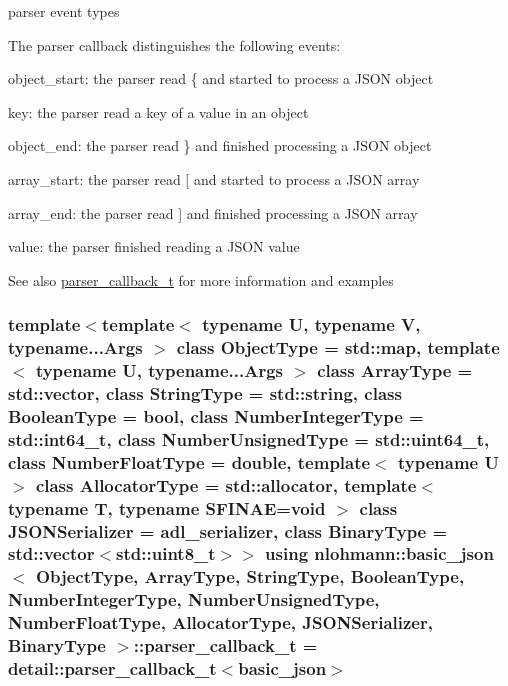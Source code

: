 parser event types 

The parser callback distinguishes the following events\+:
\begin{DoxyItemize}
\item {\ttfamily object\+\_\+start}\+: the parser read {\ttfamily \{} and started to process a J\+S\+ON object
\item {\ttfamily key}\+: the parser read a key of a value in an object
\item {\ttfamily object\+\_\+end}\+: the parser read {\ttfamily \}} and finished processing a J\+S\+ON object
\item {\ttfamily array\+\_\+start}\+: the parser read {\ttfamily \mbox{[}} and started to process a J\+S\+ON array
\item {\ttfamily array\+\_\+end}\+: the parser read {\ttfamily \mbox{]}} and finished processing a J\+S\+ON array
\item {\ttfamily value}\+: the parser finished reading a J\+S\+ON value
\end{DoxyItemize}

 \begin{DoxySeeAlso}{See also}
\hyperlink{classnlohmann_1_1basic__json_a0273d074462644e5d5a7ff313ad0d742}{parser\+\_\+callback\+\_\+t} for more information and examples 
\end{DoxySeeAlso}
\subsubsection[{\texorpdfstring{parser\+\_\+callback\+\_\+t}{parser_callback_t}}]{\setlength{\rightskip}{0pt plus 5cm}template$<$template$<$ typename U, typename V, typename...\+Args $>$ class Object\+Type = std\+::map, template$<$ typename U, typename...\+Args $>$ class Array\+Type = std\+::vector, class String\+Type  = std\+::string, class Boolean\+Type  = bool, class Number\+Integer\+Type  = std\+::int64\+\_\+t, class Number\+Unsigned\+Type  = std\+::uint64\+\_\+t, class Number\+Float\+Type  = double, template$<$ typename U $>$ class Allocator\+Type = std\+::allocator, template$<$ typename T, typename S\+F\+I\+N\+A\+E=void $>$ class J\+S\+O\+N\+Serializer = adl\+\_\+serializer, class Binary\+Type  = std\+::vector$<$std\+::uint8\+\_\+t$>$$>$ using {\bf nlohmann\+::basic\+\_\+json}$<$ Object\+Type, Array\+Type, String\+Type, Boolean\+Type, Number\+Integer\+Type, Number\+Unsigned\+Type, Number\+Float\+Type, Allocator\+Type, J\+S\+O\+N\+Serializer, Binary\+Type $>$\+::{\bf parser\+\_\+callback\+\_\+t} =  {\bf detail\+::parser\+\_\+callback\+\_\+t}$<${\bf basic\+\_\+json}$>$}\hypertarget{classnlohmann_1_1basic__json_a0273d074462644e5d5a7ff313ad0d742}{}\label{classnlohmann_1_1basic__json_a0273d074462644e5d5a7ff313ad0d742}


